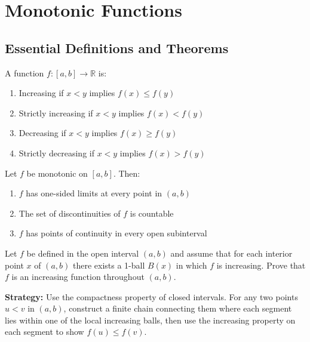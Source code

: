 \section{Monotonic Functions}

\subsection*{Essential Definitions and Theorems}

\begin{definition}
A function $f: [a,b] \to \mathbb{R}$ is:
\begin{enumerate}
\item Increasing if $x < y$ implies $f(x) \leq f(y)$
\item Strictly increasing if $x < y$ implies $f(x) < f(y)$
\item Decreasing if $x < y$ implies $f(x) \geq f(y)$
\item Strictly decreasing if $x < y$ implies $f(x) > f(y)$
\end{enumerate}
\end{definition}

\begin{theorem}
Let $f$ be monotonic on $[a,b]$. Then:
\begin{enumerate}
\item $f$ has one-sided limits at every point in $(a,b)$
\item The set of discontinuities of $f$ is countable
\item $f$ has points of continuity in every open subinterval
\end{enumerate}
\end{theorem}



\begin{problembox}
\begin{problemstatement}
Let $f$ be defined in the open interval $(a, b)$ and assume that for each interior point $x$ of $(a, b)$ there exists a 1-ball $B(x)$ in which $f$ is increasing. Prove that $f$ is an increasing function throughout $(a, b)$.
\end{problemstatement}
\end{problembox}

\noindent\textbf{Strategy:} Use the compactness property of closed intervals. For any two points $u < v$ in $(a,b)$, construct a finite chain connecting them where each segment lies within one of the local increasing balls, then use the increasing property on each segment to show $f(u) \leq f(v)$.

